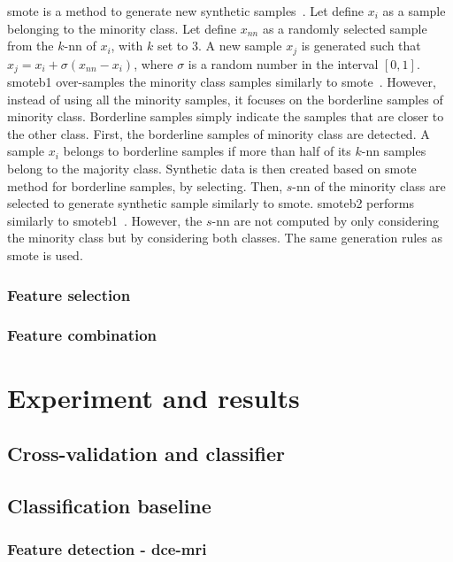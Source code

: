 \documentclass[a4paper,num-refs]{wiley-article}
\begin{document}
\Ac{smote} is a method to generate new synthetic
samples~\cite{chawla2002smote}. Let define $x_i$ as a sample belonging to the
minority class. Let define $x_{nn}$ as a randomly selected sample from the
$k$-\ac{nn} of $x_i$, with $k$ set to 3. A new sample $x_j$ is generated such
that $x_j = x_i + \sigma \left( x_{nn} - x_i \right)$, where $\sigma$ is a
random number in the interval $\left[0,1\right]$. \Ac{smoteb1} over-samples the
minority class samples similarly to \ac{smote}~\cite{han2005borderline}.
However, instead of using all the minority samples, it focuses on the
borderline samples of minority class.  Borderline samples simply indicate the
samples that are closer to the other class. First, the borderline samples of
minority class are detected. A sample $x_{i}$ belongs to borderline samples if
more than half of its $k$-\ac{nn} samples belong to the majority
class. Synthetic data is then created based on \ac{smote} method for borderline
samples, by selecting. Then, $s$-\ac{nn} of the minority class are selected to
generate synthetic sample similarly to \ac{smote}. \Ac{smoteb2} performs
similarly to \ac{smoteb1}~\cite{han2005borderline}.  However, the $s$-\ac{nn}
are not computed by only considering the minority class but by considering both
classes. The same generation rules as \ac{smote} is used.

\subsubsection{Feature selection}

\subsubsection{Feature combination}

\section{Experiment and results}
\label{sec:experiments}

\subsection{Cross-validation and classifier}

\subsection{Classification baseline}

\subsubsection{Feature detection - \Ac{dce}-\ac{mri}}
\end{document}
